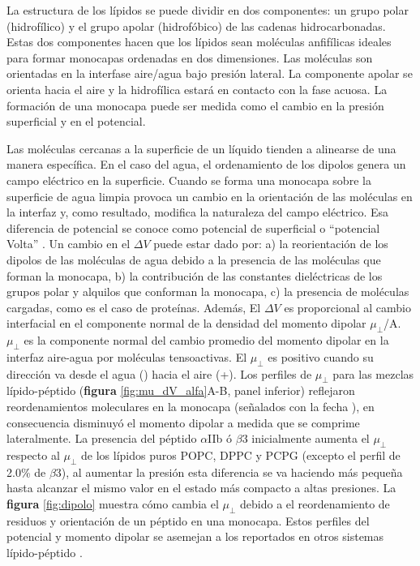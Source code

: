 La estructura de los lípidos se puede dividir en dos componentes: un grupo polar (hidrofílico) y el grupo apolar (hidrofóbico) de las cadenas hidrocarbonadas. Estas dos componentes hacen que los lípidos sean moléculas anfifílicas ideales para formar monocapas ordenadas en dos dimensiones. Las moléculas son orientadas en la interfase aire/agua bajo presión lateral. La componente apolar se orienta hacia el aire y la hidrofílica estará en contacto con la fase acuosa. La formación de una monocapa puede ser medida como el cambio en la presión superficial y en el potencial. 

Las moléculas cercanas a la superficie de un líquido tienden a alinearse de una manera específica. En el caso del agua, el ordenamiento de los dipolos genera un campo eléctrico en la superficie. Cuando se forma una monocapa sobre la superficie de agua limpia provoca un cambio en la orientación de las moléculas en la interfaz y, como resultado, modifica la naturaleza del campo eléctrico. Esa diferencia de potencial se conoce como potencial de superficial o ``potencial Volta'' \citep{Beitinger1989}. Un cambio en el $\Delta V$ puede estar dado por: a) la reorientación de los dipolos de las moléculas de agua debido a la presencia de las moléculas que forman la monocapa, b) la contribución de las constantes dieléctricas de los grupos polar y alquilos que conforman la monocapa, c) la presencia de moléculas cargadas, como es el caso de proteínas. Además, El $\Delta V$ es proporcional al cambio interfacial en el componente normal de la densidad del momento dipolar $\mu_\perp$/A. $\mu_\perp$ es la componente normal del cambio promedio del momento dipolar en la interfaz aire-agua por moléculas tensoactivas. El $\mu_\perp$ es positivo cuando su dirección va desde el agua (\text{--}) hacia el aire (+). Los perfiles de $\mu_\perp$ para las mezclas lípido-péptido (\textbf{figura} \ref{fig:mu_dV_alfa}A-B, panel inferior) reflejaron reordenamientos moleculares en la monocapa (señalados con la fecha \textcolor{blue}{\faLongArrowRight}), en consecuencia disminuyó el momento dipolar a medida que se comprime lateralmente. La presencia del péptido $\alpha$IIb ó $\beta$3 inicialmente aumenta el $\mu_\perp$ respecto al $\mu_\perp$ de los lípidos puros POPC, DPPC y PCPG (excepto el perfil de 2.0\% de $\beta$3), al aumentar la presión esta diferencia se va haciendo más pequeña hasta alcanzar el mismo valor en el estado más compacto a altas presiones. La \textbf{figura} \ref{fig:dipolo} muestra cómo cambia el $\mu_\perp$ debido a el reordenamiento de residuos y orientación de un péptido en una monocapa. Estos perfiles del potencial y momento dipolar se asemejan a los reportados en otros sistemas lípido-péptido \citep{Nakahara2005, Britt2003, Fox1957, Wnetrzak2012, Cseh1999}. 

